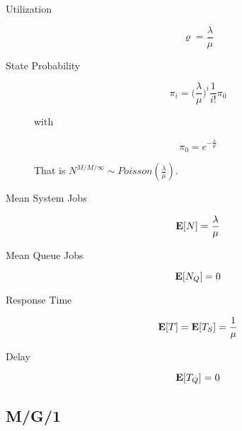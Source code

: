 \begin{description}

	\item [Utilization]
		\begin{equation}
		\varrho = \frac{\lambda}{\mu}
		\end{equation}
	
	\item [State Probability]
		\begin{equation}
		\pi_{i} = \Big(\frac{\lambda}{\mu})^{i} \frac{1}{i!} \pi_{0}
		\end{equation}
		
		with
		
		\begin{equation}
		\pi_{0} = e^{-\frac{\lambda}{\mu}}
		\end{equation}
		
		That is $N^{M/M/\infty} \sim Poisson(\frac{\lambda}{\mu})$.
		
	\item [Mean System Jobs]
		\begin{equation}
		\mathbf{E}[N] = \frac{\lambda}{\mu}
		\end{equation}	
	
	\item [Mean Queue Jobs]
		\begin{equation}
			\mathbf{E}[N_{Q}] = 0
		\end{equation}
		
	\item [Response Time]
		\begin{equation}
			\mathbf{E}[T] = \mathbf{E}[T_{S}] = \frac{1}{\mu}
		\end{equation}
		
	\item [Delay]
		\begin{equation}
		\mathbf{E}[T_{Q}] = 0
		\end{equation}
	
\end{description}




\subsection{M/G/1}

